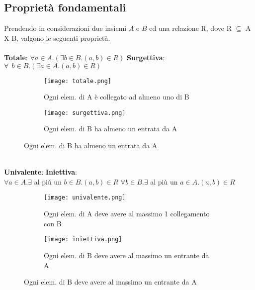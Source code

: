 \subsection{Proprietà fondamentali}
Prendendo in considerazioni due insiemi $A$ e $B$ ed una relazione R, dove R $\subseteq$ A X B, valgono le seguenti proprietà.\\ \\
\textbf{Totale}: $\forall a \in A . (\exists b \in B . (a, b) \in R)$
\hfill
\textbf{Surgettiva}: $\forall \: \: b \in B . (\exists a \in A . (a, b) \in R)$
\begin{figure}[h!]
    \vspace{-8pt}
    \begin{subfigure}{.3\textwidth}
        \centering
        \texttt{[image: totale.png]}
        \caption{Ogni elem. di A è collegato ad almeno uno di B}
    \end{subfigure}
    \hspace{4.3cm}
    \begin{subfigure}{.3\textwidth}
        \centering
        \texttt{[image: surgettiva.png]}
        \caption{Ogni elem. di B ha almeno un entrata da A}
    \end{subfigure}
\end{figure}
\\
\textbf{Univalente}: \hspace{6.3cm} \textbf{Iniettiva}:
\\
$\forall a \in A . \exists$ al più un $b \in B . (a, b) \in R$
\hspace{2.4cm} 
$\forall b \in B . \exists$ al più un $a \in A . (a, b) \in R$
\begin{figure}[h!]
    \vspace{-7pt}
    \begin{subfigure}{.3\textwidth}
        \centering
        \texttt{[image: univalente.png]}
        \caption{Ogni elem. di A deve avere al massimo 1 collegamento con B}
    \end{subfigure}
    \hspace{4.3cm}
    \begin{subfigure}{.3\textwidth}
        \centering
        \texttt{[image: iniettiva.png]}
        \caption{Ogni elem. di B deve avere al massimo un entrante da A}
    \end{subfigure}
\end{figure}
